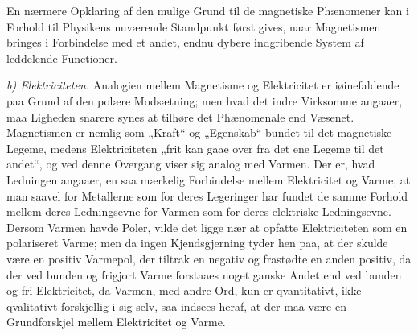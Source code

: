 \documentclass[12pt,a4paper]{book}
\newcommand{\runin}[1]{\emph{#1}\hspace{0.4em}}
\begin{document}
En nærmere Opklaring af den mulige Grund til de magnetiske Phænomener
kan i Forhold til Physikens nuværende Standpunkt først gives, naar
Magnetismen bringes i
Forbindelse med et andet, endnu dybere indgribende System af
leddelende Functioner.

\runin{b) Elektriciteten.} Analogien mellem Magnetisme og Elektricitet
er iøinefaldende paa Grund af den polære Modsætning; men hvad det
indre Virksomme angaaer, maa Ligheden snarere synes at tilhøre det
Phænomenale end Væsenet. Magnetismen er nemlig som „Kraft“ og
„Egenskab“ bundet til det magnetiske Legeme, medens Elektriciteten
„frit kan gaae over fra det ene Legeme til det andet“, og ved denne
Overgang viser sig analog med Varmen. Der er, hvad Ledningen angaaer,
en saa mærkelig Forbindelse mellem Elektricitet og Varme, at man
saavel for Metallerne som for deres Legeringer har fundet de samme
Forhold mellem deres Ledningsevne for Varmen som for deres elektriske
Ledningsevne. Dersom Varmen havde Poler, vilde det ligge nær at
opfatte Elektriciteten som en polariseret Varme; men da ingen
Kjendsgjerning tyder hen paa, at der skulde være en positiv Varmepol,
der tiltrak en negativ og frastødte en anden positiv, da der ved
bunden og frigjort Varme forstaaes noget ganske Andet end ved bunden
og fri Elektricitet, da Varmen, med andre Ord, kun er qvantitativt,
ikke qvalitativt forskjellig i sig selv, saa indsees heraf, at der maa
være en Grundforskjel mellem Elektricitet og Varme.
\end{document}
